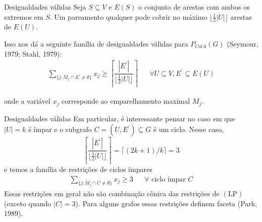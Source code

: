 \documentclass{beamer}
\begin{document}
    \begin{frame}{Desigualdades válidas}
        Seja {\color{blue} $S \subseteq V$} e {\color{blue} $E(S)$} o conjunto de arestas com ambos os extremos em {\color{blue}$S$}. Um pareamento qualquer pode cobrir no máximo {\color{blue} $\lfloor \frac{1}{2} |U| \rfloor$} arestas de {\color{blue} $E(U)$}.

        \pause
        \vspace{.5cm}
        Isso nos dá a seguinte família de desigualdades válidas para {\color{blue} $P_{ColA}(G)$ (Seymour, 1979; Stahl, 1979)}:
        {\color{blue}
        \begin{align*}
            \sum_{\{j \colon M_j \cap E^\prime \neq \emptyset\}} x_j \geq \left\lceil \dfrac{|E^\prime|}{\lfloor \frac{1}{2} |U| \rfloor} \right\rceil
            &&\forall U \subseteq V, E^\prime \subseteq E(U)
        \end{align*}
        }

        onde a variável {\color{blue} $x_j$} corresponde ao emparelhamento maximal {\color{blue} $M_j$}.
    \end{frame}

    \begin{frame}{Desigualdades válidas}
        Em particular, é interessante pensar no caso em que {\color{blue} $|U| = k$} é ímpar e o subgrafo {\color{blue} $C = (U, E^\prime) \subseteq G$} é um ciclo. Nesse caso, {\color{blue}
        $$\left\lceil \dfrac{|E^\prime|}{\lfloor \frac{1}{2} |U| \rfloor} \right\rceil = \lceil (2k + 1)/k \rceil = 3$$
        }
        \pause
        e temos a família de restrições de ciclos ímpares
        {\color{blue}
        \begin{align*}
            \sum_{\{j \colon M_j \cap C \neq \emptyset\}} x_j \geq 3
            &&\forall \text{ ciclo ímpar } C
        \end{align*}
        }
        \pause
        Essas restrições em geral não são combinação cônica das restrições de {\color{blue} $(\mathrm{LP})$} (exceto quando {\color{blue} $|C| = 3$}). Para alguns grafos essas restrições definem faceta {\color{blue} (Park, 1989)}.
    \end{frame}
\end{document}

